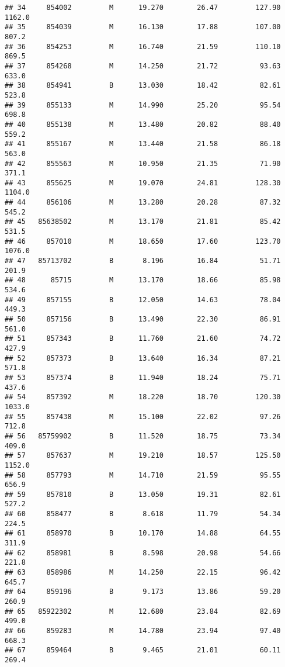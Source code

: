 \documentclass[
]{article}
\begin{document}
\begin{verbatim}
## 34     854002         M      19.270        26.47         127.90    1162.0
## 35     854039         M      16.130        17.88         107.00     807.2
## 36     854253         M      16.740        21.59         110.10     869.5
## 37     854268         M      14.250        21.72          93.63     633.0
## 38     854941         B      13.030        18.42          82.61     523.8
## 39     855133         M      14.990        25.20          95.54     698.8
## 40     855138         M      13.480        20.82          88.40     559.2
## 41     855167         M      13.440        21.58          86.18     563.0
## 42     855563         M      10.950        21.35          71.90     371.1
## 43     855625         M      19.070        24.81         128.30    1104.0
## 44     856106         M      13.280        20.28          87.32     545.2
## 45   85638502         M      13.170        21.81          85.42     531.5
## 46     857010         M      18.650        17.60         123.70    1076.0
## 47   85713702         B       8.196        16.84          51.71     201.9
## 48      85715         M      13.170        18.66          85.98     534.6
## 49     857155         B      12.050        14.63          78.04     449.3
## 50     857156         B      13.490        22.30          86.91     561.0
## 51     857343         B      11.760        21.60          74.72     427.9
## 52     857373         B      13.640        16.34          87.21     571.8
## 53     857374         B      11.940        18.24          75.71     437.6
## 54     857392         M      18.220        18.70         120.30    1033.0
## 55     857438         M      15.100        22.02          97.26     712.8
## 56   85759902         B      11.520        18.75          73.34     409.0
## 57     857637         M      19.210        18.57         125.50    1152.0
## 58     857793         M      14.710        21.59          95.55     656.9
## 59     857810         B      13.050        19.31          82.61     527.2
## 60     858477         B       8.618        11.79          54.34     224.5
## 61     858970         B      10.170        14.88          64.55     311.9
## 62     858981         B       8.598        20.98          54.66     221.8
## 63     858986         M      14.250        22.15          96.42     645.7
## 64     859196         B       9.173        13.86          59.20     260.9
## 65   85922302         M      12.680        23.84          82.69     499.0
## 66     859283         M      14.780        23.94          97.40     668.3
## 67     859464         B       9.465        21.01          60.11     269.4

\end{verbatim}
\end{document}
